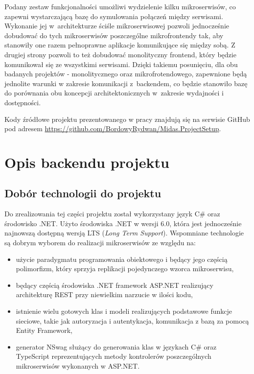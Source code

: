 \documentclass{SGGW-thesis}
\begin{document}
Podany zestaw funkcjonalności umożliwi wydzielenie kilku mikroserwisów, co zapewni wystarczającą bazę do symulowania połączeń między serwisami. Wykonanie jej w~architekturze ściśle mikroserwisowej pozwoli jednocześnie dobudować do tych mikroserwisów poszczególne mikrofrontendy tak, aby stanowiły one razem pełnoprawne aplikacje komunikujące się między sobą. Z drugiej strony pozwoli to też dobudować monolityczny frontend, który będzie komunikował się ze wszystkimi serwisami. Dzięki takiemu posunięciu, dla obu badanych projektów - monolitycznego oraz mikrofrotendowego, zapewnione będą jednolite warunki w zakresie komunikacji z~backendem, co będzie stanowiło bazę do porównania obu koncepcji architektonicznych w~zakresie wydajności i dostępności.

Kody źródłowe projektu prezentowanego w pracy znajdują się na serwisie GitHub pod adresem \url{https://github.com/BordowyRydwan/Midas.ProjectSetup}.

\chapter{Opis backendu projektu}
\section{Dobór technologii do projektu}
Do zrealizowania tej części projektu został wykorzystany język C\# oraz środowisko .NET. Użyto środowiska .NET w wersji 6.0, która jest jednocześnie najnowszą dostępną wersją LTS (\textit{Long Term Support}). Wspomniane technologie są dobrym wyborem do realizacji mikroserwisów ze względu na:

\begin{itemize}
	\item użycie paradygmatu programowania obiektowego i będący jego częścią polimorfizm, który sprzyja replikacji pojedynczego wzorca mikroserwisu,
	\item będący częścią środowiska .NET framework ASP.NET realizujący architekturę REST przy niewielkim narzucie w ilości kodu,
	\item istnienie wielu gotowych klas i modeli realizujących podstawowe funkcje sieciowe, takie jak autoryzacja i autentykacja, komunikacja z bazą za pomocą Entity Framework,
	\item generator NSwag służący do generowania klas w językach C\# oraz TypeScript reprezentujących metody kontrolerów poszczególnych mikroserwisów wykonanych w ASP.NET.
\end{itemize}
\end{document}
